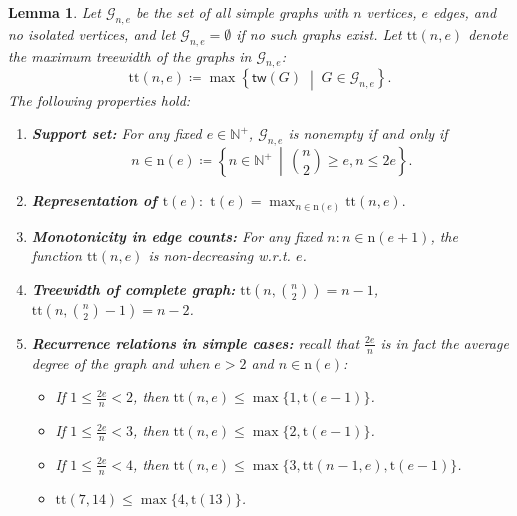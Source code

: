 \documentclass[12pt]{article}
\theoremstyle{plain}
\newtheorem{lemma}{Lemma}
\theoremstyle{definition}
\newcommand{\treewidthp}[1]{\mathsf{tw}(#1)}
\newcommand{\graphset}{\mathcal{G}}
\newcommand{\graphsetne}[2]{\graphset_{#1,#2}}
\newcommand{\positivenaturals}{\mathbb{N}^+}
\begin{document}
\begin{bibunit}[agsm]
\begin{lemma}
\label{lem:property_of_tt}
Let $\graphsetne{n}{e}$ be the set of all simple graphs with $n$ vertices, $e$ edges, and no isolated vertices, and let $\graphsetne{n}{e} = \emptyset$ if no such graphs exist. Let $\mathrm{tt}(n, e)$ denote the maximum treewidth of the graphs in $\graphsetne{n}{e}$:
\begin{equation*}
\mathrm{tt}(n, e) \coloneqq \max\left\{ \treewidthp{G}\;\middle|\; G \in \graphsetne{n}{e} \right\}.
\end{equation*}
The following properties hold:
\begin{enumerate}
    \item \textbf{Support set:} For any fixed $e \in \positivenaturals $, $\graphsetne{n}{e}$ is nonempty if and only if 
    \begin{equation*}
        n \in \mathrm{n}(e) \coloneqq \left\{ n \in \positivenaturals \, \middle \vert\,  \binom{n}{2} \geq e,  n \leq 2e \right\}.
    \end{equation*}
    \item \textbf{Representation of $\mathrm{t}(e): $} $ \mathrm{t}(e) = \max_{n \in \mathrm{n}(e)} \mathrm{tt} (n, e).$
    \item \textbf{Monotonicity in edge counts:} For any fixed $n: n \in \mathrm{n}(e+1) $, the function $\mathrm{tt}(n, e)$ is non-decreasing w.r.t. $e$.
    \item \textbf{Treewidth of complete graph:} $\mathrm{tt}(n, \binom{n}{2}) =  n - 1$, $\mathrm{tt}(n, \binom{n}{2} - 1) = n - 2$.
    \item \textbf{Recurrence relations in simple cases:}  recall that $\frac{2e}{n}$ is in fact the average degree of the graph and when $e > 2$ and $n \in \mathrm{n} (e)$:
    \begin{itemize}
        \item[(1)] If $1 \leq \frac{2e}{n} < 2$, then $ \mathrm{tt}(n,e) \leq \max\{ 1, \mathrm{t}(e-1) \}$.
        \item[(2)] If $1 \leq \frac{2e}{n} < 3$, then $ \mathrm{tt}(n,e)  \leq \max\{ 2, \mathrm{t}(e-1) \} $.
        \item[(3)] If $1 \leq \frac{2e}{n} < 4$, then $ \mathrm{tt}(n,e)  \leq \max\{ 3, \mathrm{tt}(n - 1 ,e), \mathrm{t}(e-1) \}$.
        \item[(4)] $ \mathrm{tt}(7,14) \leq  \max\{ 4,  \mathrm{t}(13) \}$.
    \end{itemize}
\end{enumerate}
\end{lemma}


\end{bibunit}
\end{document}
